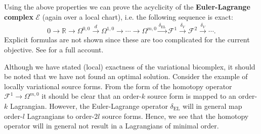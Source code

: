     Using the above properties we can prove the acyclicity of the \textbf{Euler-Lagrange complex} $\mathcal{E}$ (again over a local chart), i.e. the following sequence is exact:
    \begin{gather}
        0\longrightarrow\mathbb{R}\longrightarrow\Omega^{0,0}\overset{d}{\longrightarrow}\Omega^{1,0}\longrightarrow\cdots\longrightarrow\Omega^{m,0}\overset{\delta_{\text{EL}}}{\longrightarrow}\mathcal{F}^1\overset{\delta_V}{\longrightarrow}\mathcal{F}^2\overset{\delta_V}{\longrightarrow}\cdots.
    \end{gather}
    Explicit formulas are not shown since these are too complicated for the current objective. See \cite{var_bicomplex} for a full account.

    \begin{remark}
        Although we have stated (local) exactness of the variational bicomplex, it should be noted that we have not found an optimal solution. Consider the example of locally variational source forms. From the form of the homotopy operator $\mathcal{F}^1\rightarrow\Omega^{m,0}$ it should be clear that an order-$k$ source form is mapped to an order-$k$ Lagrangian. However, the Euler-Lagrange operator $\delta_{\text{EL}}$ will in general map order-$l$ Lagrangians to order-$2l$ source forms. Hence, we see that the homotopy operator will in general not result in a Lagrangians of minimal order.
    \end{remark}

